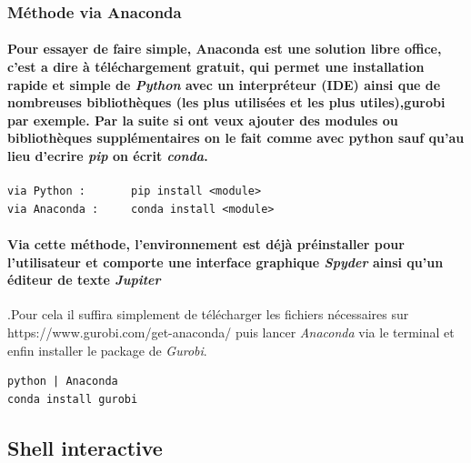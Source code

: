 \documentclass[a4paper, 12pt, twoside]{article}
\begin{document}
\subsubsection{Méthode via Anaconda }
\paragraph{Pour essayer de faire simple, Anaconda est une solution libre office, c'est a dire à téléchargement gratuit, qui permet une installation rapide et simple de \textit{Python} avec un interpréteur (IDE) ainsi que de nombreuses bibliothèques (les plus utilisées et les plus utiles),gurobi par exemple. Par la suite si ont veux ajouter des modules ou bibliothèques supplémentaires  on le fait comme avec python sauf qu'au lieu d'ecrire \textit{pip} on écrit \textit{conda}.}
\begin{verbatim}
via Python :       pip install <module>
via Anaconda :     conda install <module>
\end{verbatim}

\paragraph{Via cette méthode, l'environnement est déjà préinstaller pour l'utilisateur et comporte une interface graphique \textit{Spyder} ainsi qu'un éditeur de texte \textit{Jupiter}}.Pour cela il suffira simplement de télécharger les fichiers nécessaires sur https://www.gurobi.com/get-anaconda/ puis lancer \textit{Anaconda} via le terminal et enfin installer le package de \textit{Gurobi}.
\begin{verbatim}
python | Anaconda
conda install gurobi 
\end{verbatim}


\subsection{Shell interactive }
\end{document}
